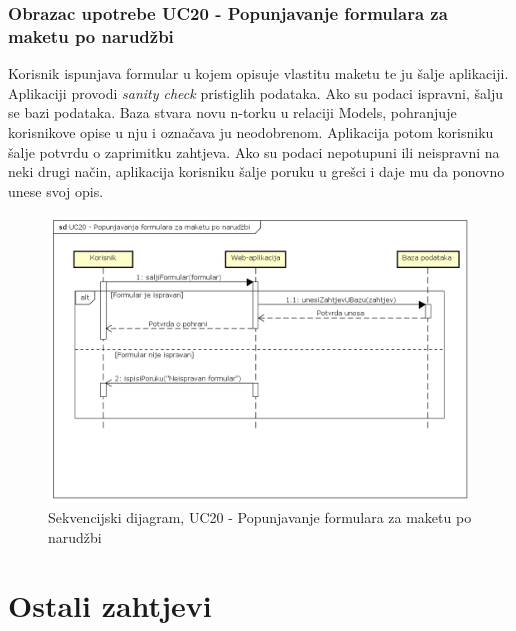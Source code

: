 				\subsubsection{Obrazac upotrebe UC20 - Popunjavanje formulara za maketu po narudžbi}
					\noindent Korisnik ispunjava formular u kojem opisuje vlastitu maketu te ju šalje aplikaciji. Aplikaciji provodi \textit{sanity check} pristiglih podataka. Ako su podaci ispravni, šalju se bazi podataka. Baza stvara novu n-torku u relaciji Models, pohranjuje korisnikove opise u nju i označava ju neodobrenom. Aplikacija potom korisniku šalje potvrdu o zaprimitku zahtjeva. Ako su podaci nepotupuni ili neispravni na neki drugi način, aplikacija korisniku šalje poruku u grešci i daje mu da ponovno unese svoj opis.
					\begin{figure}[H]
						\includegraphics[width=.9\linewidth]{dijagrami/SD_UC20.png}
						\centering
						\caption{Sekvencijski dijagram, UC20 - Popunjavanje formulara za maketu po narudžbi}
						\label{fig:sekvdija3}
					\end{figure}
				
			\eject
	
		\section{Ostali zahtjevi}
		
